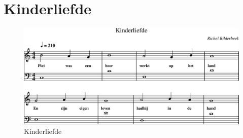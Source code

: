 \chapter{Kinderliefde}



\begin{figure}[!htbp]
  \includegraphics[width=\textwidth,height=\textheight,keepaspectratio]{../songs/07_kinderliefde.png}
  \caption{Kinderliefde}
  \label{fig:07_kinderliefde}
\end{figure}
